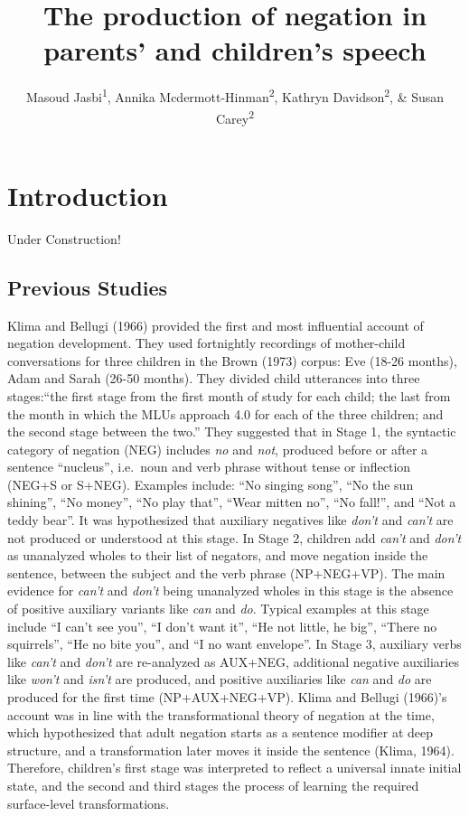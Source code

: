 \documentclass[man,floatsintext,draftall]{apa6}
\title{The production of negation in parents' and children's speech}
\author{Masoud Jasbi\textsuperscript{1}, Annika Mcdermott-Hinman\textsuperscript{2}, Kathryn Davidson\textsuperscript{2}, \& Susan Carey\textsuperscript{2}}
\date{}
\affiliation{
\vspace{0.5cm}
\textsuperscript{1} UC Davis\\\textsuperscript{2} Harvard University}
\begin{document}
\maketitle

\hypertarget{introduction}{%
\section{Introduction}\label{introduction}}

Under Construction!

\hypertarget{previous-studies}{%
\subsection{Previous Studies}\label{previous-studies}}

Klima and Bellugi (1966) provided the first and most influential account of negation development. They used fortnightly recordings of mother-child conversations for three children in the Brown (1973) corpus: Eve (18-26 months), Adam and Sarah (26-50 months). They divided child utterances into three stages:\enquote{the first stage from the first month of study for each child; the last from the month in which the MLUs approach 4.0 for each of the three children; and the second stage between the two.} They suggested that in Stage 1, the syntactic category of negation (NEG) includes \emph{no} and \emph{not}, produced before or after a sentence \enquote{nucleus}, i.e.~noun and verb phrase without tense or inflection (NEG+S or S+NEG). Examples include: \enquote{No singing song}, \enquote{No the sun shining}, \enquote{No money}, \enquote{No play that}, \enquote{Wear mitten no}, \enquote{No fall!}, and \enquote{Not a teddy bear}. It was hypothesized that auxiliary negatives like \emph{don't} and \emph{can't} are not produced or understood at this stage. In Stage 2, children add \emph{can't} and \emph{don't} as unanalyzed wholes to their list of negators, and move negation inside the sentence, between the subject and the verb phrase (NP+NEG+VP). The main evidence for \emph{can't} and \emph{don't} being unanalyzed wholes in this stage is the absence of positive auxiliary variants like \emph{can} and \emph{do}. Typical examples at this stage include \enquote{I can't see you}, \enquote{I don't want it}, \enquote{He not little, he big}, \enquote{There no squirrels}, \enquote{He no bite you}, and \enquote{I no want envelope}. In Stage 3, auxiliary verbs like \emph{can't} and \emph{don't} are re-analyzed as AUX+NEG, additional negative auxiliaries like \emph{won't} and \emph{isn't} are produced, and positive auxiliaries like \emph{can} and \emph{do} are produced for the first time (NP+AUX+NEG+VP). Klima and Bellugi (1966)'s account was in line with the transformational theory of negation at the time, which hypothesized that adult negation starts as a sentence modifier at deep structure, and a transformation later moves it inside the sentence (Klima, 1964). Therefore, children's first stage was interpreted to reflect a universal innate initial state, and the second and third stages the process of learning the required surface-level transformations.
\end{document}
